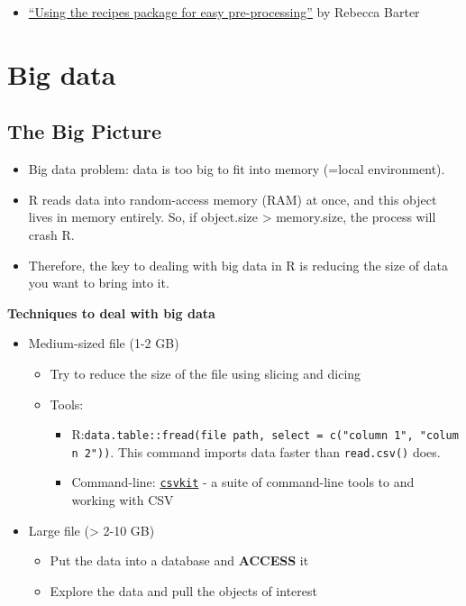 \documentclass[
]{book}
\providecommand{\tightlist}{%
  \setlength{\itemsep}{0pt}\setlength{\parskip}{0pt}}
\begin{document}
\begin{itemize}
\tightlist
\item
  \href{http://www.rebeccabarter.com/blog/2019-06-06_pre_processing/}{``Using the recipes package for easy pre-processing''} by Rebecca Barter
\end{itemize}

\hypertarget{big_data}{%
\chapter{Big data}\label{big_data}}

\hypertarget{the-big-picture-9}{%
\section{The Big Picture}\label{the-big-picture-9}}

\begin{itemize}
\tightlist
\item
  Big data problem: data is too big to fit into memory (=local environment).
\item
  R reads data into random-access memory (RAM) at once, and this object lives in memory entirely. So, if object.size \textgreater{} memory.size, the process will crash R.
\item
  Therefore, the key to dealing with big data in R is reducing the size of data you want to bring into it.
\end{itemize}

\textbf{Techniques to deal with big data}

\begin{itemize}
\tightlist
\item
  Medium-sized file (1-2 GB)

  \begin{itemize}
  \tightlist
  \item
    Try to reduce the size of the file using slicing and dicing
  \item
    Tools:

    \begin{itemize}
    \tightlist
    \item
      R:\texttt{data.table::fread(file\ path,\ select\ =\ c("column\ 1",\ "column\ 2"))}. This command imports data faster than \texttt{read.csv()} does.
    \item
      Command-line: \href{https://csvkit.readthedocs.io/en/latest/}{\texttt{csvkit}} - a suite of command-line tools to and working with CSV
    \end{itemize}
  \end{itemize}
\item
  Large file (\textgreater{} 2-10 GB)

  \begin{itemize}
  \tightlist
  \item
    Put the data into a database and \textbf{ACCESS} it
  \item
    Explore the data and pull the objects of interest
  \end{itemize}
\end{itemize}
\end{document}
